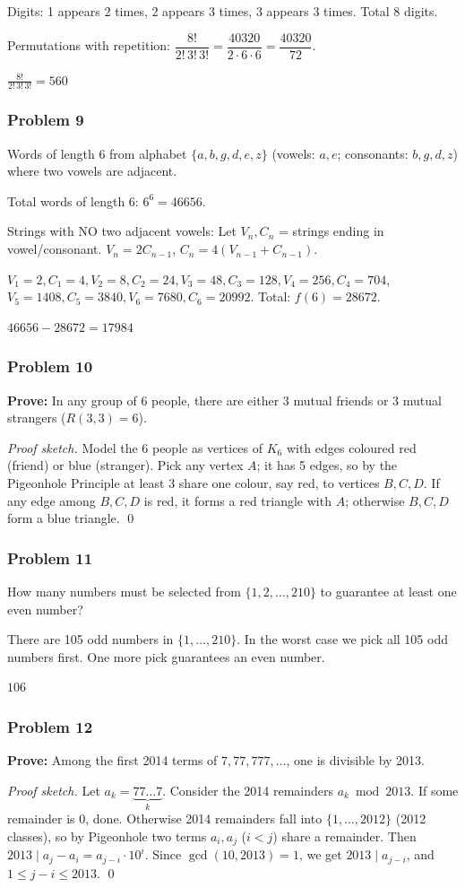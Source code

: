 Digits: 1 appears 2 times, 2 appears 3 times, 3 appears 3 times. Total 8 digits.

Permutations with repetition: $\dfrac{8!}{2!\,3!\,3!} = \dfrac{40320}{2\cdot6\cdot6} = \dfrac{40320}{72}$.

$\boxed{\frac{8!}{2!\,3!\,3!} = 560}$

\subsubsection*{Problem 9}
Words of length 6 from alphabet $\{a, b, g, d, e, z\}$ (vowels: $a, e$; consonants: $b, g, d, z$) where two vowels are adjacent.

Total words of length 6: $6^6 = 46656$.

Strings with NO two adjacent vowels: Let $V_n, C_n$ = strings ending in vowel/consonant. $V_n = 2C_{n-1}$, $C_n = 4(V_{n-1}+C_{n-1})$.

$V_1=2, C_1=4, V_2=8, C_2=24, V_3=48, C_3=128, V_4=256, C_4=704$,
$V_5=1408, C_5=3840, V_6=7680, C_6=20992$. Total: $f(6)=28672$.

$\boxed{46656 - 28672 = 17984}$

\subsubsection*{Problem 10}
\textbf{Prove:} In any group of 6 people, there are either 3 mutual friends or 3 mutual strangers ($R(3,3)=6$).

\textit{Proof sketch.}
Model the 6 people as vertices of $K_6$ with edges coloured red (friend) or blue (stranger). Pick any vertex $A$; it has 5 edges, so by the Pigeonhole Principle at least 3 share one colour, say red, to vertices $B,C,D$. If any edge among $B,C,D$ is red, it forms a red triangle with $A$; otherwise $B,C,D$ form a blue triangle. \qed

\subsubsection*{Problem 11}
How many numbers must be selected from $\{1,2,\dots,210\}$ to guarantee at least one even number?

There are 105 odd numbers in $\{1,\dots,210\}$. In the worst case we pick all 105 odd numbers first. One more pick guarantees an even number.

$\boxed{106}$

\subsubsection*{Problem 12}
\textbf{Prove:} Among the first 2014 terms of $7, 77, 777, \ldots$, one is divisible by 2013.

\textit{Proof sketch.}
Let $a_k = \underbrace{77\ldots7}_{k}$. Consider the 2014 remainders $a_k \bmod 2013$. If some remainder is 0, done. Otherwise 2014 remainders fall into $\{1,\dots,2012\}$ (2012 classes), so by Pigeonhole two terms $a_i, a_j$ ($i<j$) share a remainder. Then $2013 \mid a_j - a_i = a_{j-i}\cdot 10^i$. Since $\gcd(10,2013)=1$, we get $2013\mid a_{j-i}$, and $1\le j-i\le 2013$. \qed

